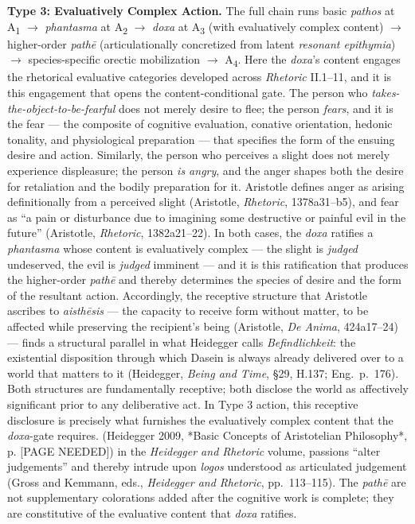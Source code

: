 \documentclass{article}
\begin{document}
\textbf{Type 3: Evaluatively Complex Action.} The full chain runs basic \textit{pathos} at A\textsubscript{1} $\rightarrow$ \textit{phantasma} at A\textsubscript{2} $\rightarrow$ \textit{doxa} at A\textsubscript{3} (with evaluatively complex content) $\rightarrow$ higher-order \textit{path\=e} (articulationally concretized from latent \textit{resonant epithymia}) $\rightarrow$ species-specific orectic mobilization $\rightarrow$ A\textsubscript{4}. Here the \textit{doxa}'s content engages the rhetorical evaluative categories developed across \textit{Rhetoric} II.1--11, and it is this engagement that opens the content-conditional gate. The person who \textit{takes-the-object-to-be-fearful} does not merely desire to flee; the person \textit{fears}, and it is the fear --- the composite of cognitive evaluation, conative orientation, hedonic tonality, and physiological preparation --- that specifies the form of the ensuing desire and action. Similarly, the person who perceives a slight does not merely experience displeasure; the person \textit{is angry}, and the anger shapes both the desire for retaliation and the bodily preparation for it. Aristotle defines anger as arising definitionally from a perceived slight (Aristotle, \textit{Rhetoric}, 1378a31--b5), and fear as ``a pain or disturbance due to imagining some destructive or painful evil in the future'' (Aristotle, \textit{Rhetoric}, 1382a21--22). In both cases, the \textit{doxa} ratifies a \textit{phantasma} whose content is evaluatively complex --- the slight is \textit{judged} undeserved, the evil is \textit{judged} imminent --- and it is this ratification that produces the higher-order \textit{path\=e} and thereby determines the species of desire and the form of the resultant action. Accordingly, the receptive structure that Aristotle ascribes to \textit{aisth\=esis} --- the capacity to receive form without matter, to be affected while preserving the recipient's being (Aristotle, \textit{De Anima}, 424a17--24) --- finds a structural parallel in what Heidegger calls \textit{Befindlichkeit}: the existential disposition through which Dasein is always already delivered over to a world that matters to it (Heidegger, \textit{Being and Time}, \S29, H.137; Eng.~p.~176). Both structures are fundamentally receptive; both disclose the world as affectively significant prior to any deliberative act. In Type 3 action, this receptive disclosure is precisely what furnishes the evaluatively complex content that the \textit{doxa}-gate requires. (Heidegger 2009, *Basic Concepts of Aristotelian Philosophy*, p. [PAGE NEEDED]) in the \textit{Heidegger and Rhetoric} volume, passions ``alter judgements'' and thereby intrude upon \textit{logos} understood as articulated judgement (Gross and Kemmann, eds., \textit{Heidegger and Rhetoric}, pp.~113--115). The \textit{path\=e} are not supplementary colorations added after the cognitive work is complete; they are constitutive of the evaluative content that \textit{doxa} ratifies. 
\end{document}
